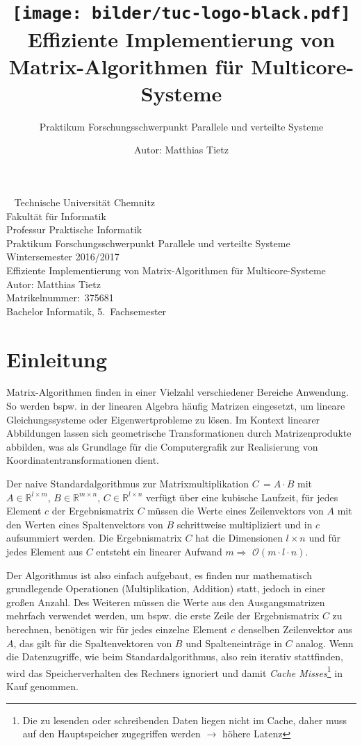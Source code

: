 \documentclass[a4paper,11pt]{scrartcl}
\title{\texttt{[image: bilder/tuc-logo-black.pdf]}
\\Effiziente Implementierung von Matrix-Algorithmen für Multicore-Systeme
}
\subtitle{Praktikum Forschungsschwerpunkt Parallele und verteilte Systeme}
\author{Autor: Matthias Tietz}
\newcommand{\bspw}{\mbox{bspw.}\xspace}
\begin{document}
\maketitle \thispagestyle{empty}

\newpage
\thispagestyle{empty}
~
\vfill
Technische Universität Chemnitz\\
Fakultät für Informatik\\
Professur Praktische Informatik\\
Praktikum Forschungsschwerpunkt Parallele und verteilte Systeme\\
Wintersemester 2016/2017\\

Effiziente Implementierung von Matrix-Algorithmen für Multicore-Systeme\\
Autor: Matthias Tietz\\
Matrikelnummer:~375681\\
Bachelor Informatik, 5.~Fachsemester

\newpage \tableofcontents
\newpage

\section{Einleitung}\label{chp:Einleitung}
Matrix-Algorithmen finden in einer Vielzahl verschiedener Bereiche Anwendung.
So werden \bspw in der linearen Algebra häufig Matrizen eingesetzt, um lineare Gleichungssysteme oder Eigenwertprobleme zu lösen. Im Kontext linearer Abbildungen lassen sich geometrische Transformationen
durch Matrizenprodukte abbilden, was als Grundlage für die Computergrafik zur Realisierung von Koordinatentransformationen dient.\newline

Der naive Standardalgorithmus zur Matrixmultiplikation 
$C\,= A \cdot B$ mit $A \in \mathbb{R}^{l \times m}$, $B \in \mathbb{R}^{m \times n}$,
$C \in \mathbb{R}^{l \times n}$ verfügt über eine kubische Laufzeit, für jedes Element $c$ der 
Ergebnismatrix $C$ müssen die Werte eines Zeilenvektors von $A$ mit den Werten eines Spaltenvektors
von $B$ schrittweise multipliziert und in $c$ aufsummiert werden. Die Ergebnismatrix $C$
hat die Dimensionen $l \times n$ und für jedes Element aus $C$ entsteht ein linearer Aufwand
$m \Rightarrow$ $\mathcal{O}(m \cdot l \cdot n)$.\newline

Der Algorithmus ist also einfach aufgebaut, es finden nur mathematisch grundlegende Operationen
(Multiplikation, Addition) statt, jedoch in einer großen Anzahl. 
Des Weiteren müssen die Werte aus den Ausgangsmatrizen mehrfach verwendet werden, um \bspw die erste Zeile der Ergebnismatrix $C$ zu berechnen,
benötigen wir für jedes einzelne Element $c$ denselben Zeilenvektor aus $A$, das gilt für die
Spaltenvektoren von $B$ und Spalteneinträge in $C$ analog.
Wenn die Datenzugriffe, wie beim Standardalgorithmus, also rein iterativ stattfinden,
wird das Speicherverhalten des Rechners ignoriert und damit \emph{Cache Misses}\footnote{Die zu 
lesenden oder schreibenden Daten liegen nicht im Cache, daher muss auf den Hauptspeicher 
zugegriffen werden $\rightarrow$ höhere Latenz} in Kauf genommen. \newline
\end{document}
